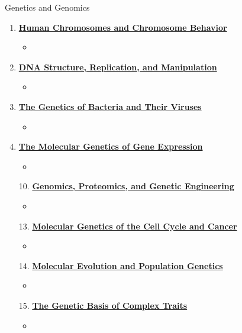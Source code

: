 \documentclass[12pt,letterpaper]{article}
\begin{document}
\begin{contbox}{Genetics and Genomics}
{\begin{enumerate}[font=\bfseries, wide]
\begin{itemize}
        \item \hyperlink{4.6}{Recombination is initiated by a double-stranded break in DNA}
    \end{itemize}
    \item \hyperlink{5}{\textbf{Human Chromosomes and Chromosome Behavior}}
    \begin{itemize}
        \item 
    \end{itemize}
    \item \hyperlink{6}{\textbf{DNA Structure, Replication, and Manipulation}}
    \begin{itemize}
        \item 
    \end{itemize}
    \item \hyperlink{7}{\textbf{The Genetics of Bacteria and Their Viruses}}
    \begin{itemize}
        \item 
    \end{itemize}
    \item \hyperlink{8}{\textbf{The Molecular Genetics of Gene Expression}}
    \begin{itemize}
        \item 
    \end{itemize}
    \item [10.] \hyperlink{10}{\textbf{Genomics, Proteomics, and Genetic Engineering}}
    \begin{itemize}
        \item 
    \end{itemize}
    \item [13.] \hyperlink{13}{\textbf{Molecular Genetics of the Cell Cycle and Cancer}}
    \begin{itemize}
        \item 
    \end{itemize}    
    \item [14.] \hyperlink{14}{\textbf{Molecular Evolution and Population Genetics}}
    \begin{itemize}
        \item 
    \end{itemize}
    \item [15.] \hyperlink{15}{\textbf{The Genetic Basis of Complex Traits}}
    \begin{itemize}
        \item 
    \end{itemize}
\end{enumerate}
}\end{contbox}
\end{document}
